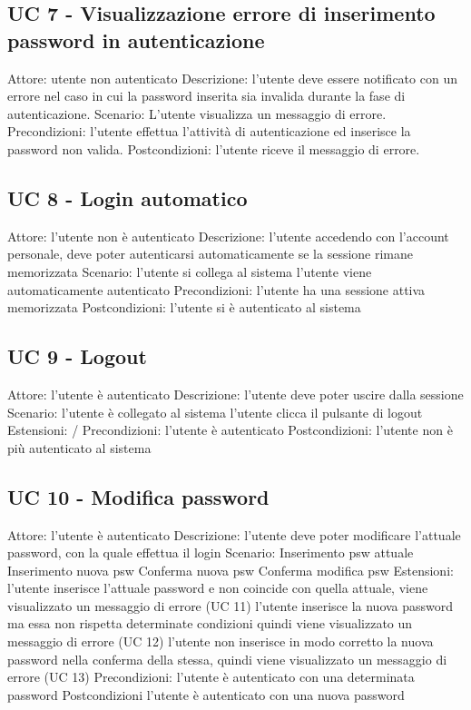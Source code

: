 \subsection{UC 7 - Visualizzazione errore di inserimento password in autenticazione} 
Attore: utente non autenticato
Descrizione: l’utente deve essere notificato con un errore nel caso in cui la password inserita sia invalida durante la fase di autenticazione.
Scenario: L’utente visualizza un messaggio di errore. 
Precondizioni: l’utente effettua l’attività di autenticazione ed inserisce la password non valida.
Postcondizioni: l’utente riceve il messaggio di errore.

\subsection{UC 8 - Login automatico}
Attore: l’utente non è autenticato 
Descrizione: l’utente accedendo con l’account personale, deve poter autenticarsi automaticamente se la sessione rimane memorizzata
Scenario:
l’utente si collega al sistema 
l’utente viene automaticamente autenticato 
Precondizioni: l’utente ha una sessione attiva memorizzata
Postcondizioni: l’utente si è autenticato al sistema

\subsection{UC 9 - Logout}
Attore: l’utente è autenticato 
Descrizione: l’utente deve poter uscire dalla sessione
Scenario:
l’utente è collegato al sistema
l’utente clicca il pulsante di logout
Estensioni: /
Precondizioni: l’utente è autenticato
Postcondizioni: l’utente non è più autenticato al sistema

\subsection{UC 10 - Modifica password}
Attore: l’utente è autenticato
Descrizione: l’utente deve poter modificare l’attuale password, con la quale effettua il login
Scenario:
Inserimento psw attuale
Inserimento nuova psw
Conferma nuova psw
Conferma modifica psw
Estensioni: 
l’utente inserisce l’attuale password e non coincide con quella attuale, viene visualizzato un messaggio di errore (UC 11)
l’utente inserisce la nuova password ma essa non rispetta determinate condizioni quindi viene visualizzato un messaggio di errore (UC 12)
l’utente non inserisce in modo corretto la nuova password nella conferma della stessa, quindi viene visualizzato un messaggio di errore (UC 13)
Precondizioni: l’utente è autenticato con una determinata password
Postcondizioni l’utente è autenticato con una nuova password

